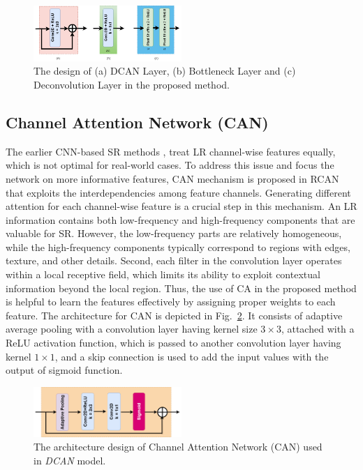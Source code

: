 \documentclass[conference]{IEEEtran}
\begin{document}
\begin{figure}[h!]
    \centering
    \includegraphics[width=0.5\textwidth]{fi.drawio (2).png} %
    \caption{The design of (a) DCAN Layer, (b) Bottleneck Layer and (c) Deconvolution Layer in the proposed method.}
    \label{fig:label6.10}
\end{figure}

\subsection{Channel Attention Network (CAN)}
The earlier CNN-based SR methods \cite{SRCNN, VDSR, DRCN, ResNet, EDSR, SRDensenet}, treat LR channel-wise features equally, which is not optimal for real-world cases. To address this issue and focus the network on more informative features, CAN mechanism is proposed in RCAN \cite{RCAN} that exploits the interdependencies among feature channels. Generating different attention for each channel-wise feature is a crucial step in this mechanism. An LR information contains both low-frequency and high-frequency components that are valuable for SR. However, the low-frequency parts are relatively homogeneous, while the high-frequency components typically correspond to regions with edges, texture, and other details. Second, each filter in the convolution layer operates within a local receptive field, which limits its ability to exploit contextual information beyond the local region. Thus, the use of CA in the proposed method is helpful to learn the features effectively by assigning proper weights to each feature. The architecture for CAN is depicted in Fig.~\ref{fig:label6.11}. It consists of adaptive average pooling with a convolution layer having kernel size $3\times3$, attached with a ReLU activation function, which is passed to another convolution layer having kernel $1\times1$, and a skip connection is used to add the input values with the output of sigmoid function.
\begin{figure}[h!]
    \centering
    \includegraphics[width=0.5\textwidth]{4.drawio_fff.png} %
    \caption{The architecture design of Channel Attention Network (CAN) used in \emph{DCAN} model.}
    \label{fig:label6.11}
\end{figure}
\end{document}
